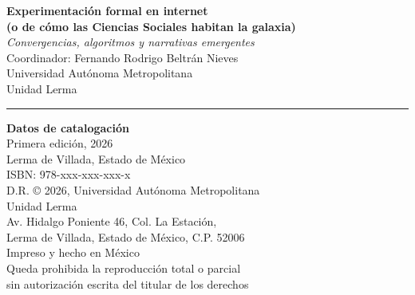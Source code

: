 \begin{titlepage}
    \thispagestyle{empty}
    \vspace*{2cm}

    \normalfont
    \centering
        \textbf{Experimentación formal en internet \\ (o de cómo las Ciencias Sociales habitan la galaxia)} \\
        \textit{Convergencias, algoritmos y narrativas emergentes} \\
        \vspace{0.5cm}
        \small
        Coordinador: Fernando Rodrigo Beltrán Nieves \\
        Universidad Autónoma Metropolitana \\
        Unidad Lerma \\
        
        
        \rule{0.6\textwidth}{0.4pt}
        \vspace{0.5cm}
        
        \small
        \textbf{Datos de catalogación} \\
        \vspace{0.3cm}
        Primera edición, 2026 \\
        Lerma de Villada, Estado de México \\
        \vspace{0.3cm}
        ISBN: 978-xxx-xxx-xxx-x \\
        D.R. © 2026, Universidad Autónoma Metropolitana \\
        Unidad Lerma \\
        Av. Hidalgo Poniente 46, Col. La Estación, \\
        Lerma de Villada, Estado de México, C.P. 52006 \\
        \vspace{0.3cm}
        Impreso y hecho en México \\
        \vspace{0.3cm}
        Queda prohibida la reproducción total o parcial \\
        sin autorización escrita del titular de los derechos

\end{titlepage}

\clearpage
\pagestyle{headings}  %
\setcounter{page}{1}